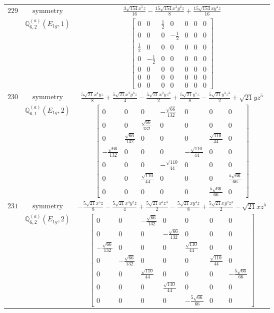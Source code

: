 \documentclass[fleqn,8pt,landscape]{jsarticle}
\begin{document}
\begin{longtable}{ccc}
$ 229 $ & $ \text{symmetry} $ & $ \frac{3 \sqrt{154} x^{5} z}{16} - \frac{15 \sqrt{154} x^{3} y^{2} z}{8} + \frac{15 \sqrt{154} x y^{4} z}{16} $ \\
$  $ & $ \mathbb{Q}_{6,2}^{(a)}(E_{1g},1) $ & $ \begin{bmatrix} 0 & 0 & \frac{1}{2} & 0 & 0 & 0 & 0 \\ 0 & 0 & 0 & - \frac{1}{2} & 0 & 0 & 0 \\ \frac{1}{2} & 0 & 0 & 0 & 0 & 0 & 0 \\ 0 & - \frac{1}{2} & 0 & 0 & 0 & 0 & 0 \\ 0 & 0 & 0 & 0 & 0 & 0 & 0 \\ 0 & 0 & 0 & 0 & 0 & 0 & 0 \\ 0 & 0 & 0 & 0 & 0 & 0 & 0 \end{bmatrix} $ \\ \hline
$ 230 $ & $ \text{symmetry} $ & $ \frac{5 \sqrt{21} x^{4} y z}{8} + \frac{5 \sqrt{21} x^{2} y^{3} z}{4} - \frac{5 \sqrt{21} x^{2} y z^{3}}{2} + \frac{5 \sqrt{21} y^{5} z}{8} - \frac{5 \sqrt{21} y^{3} z^{3}}{2} + \sqrt{21} y z^{5} $ \\
$  $ & $ \mathbb{Q}_{6,1}^{(a)}(E_{1g},2) $ & $ \begin{bmatrix} 0 & 0 & 0 & - \frac{\sqrt{66}}{132} & 0 & 0 & 0 \\ 0 & 0 & \frac{\sqrt{66}}{132} & 0 & 0 & 0 & 0 \\ 0 & \frac{\sqrt{66}}{132} & 0 & 0 & 0 & \frac{\sqrt{110}}{44} & 0 \\ - \frac{\sqrt{66}}{132} & 0 & 0 & 0 & - \frac{\sqrt{110}}{44} & 0 & 0 \\ 0 & 0 & 0 & - \frac{\sqrt{110}}{44} & 0 & 0 & 0 \\ 0 & 0 & \frac{\sqrt{110}}{44} & 0 & 0 & 0 & \frac{5 \sqrt{66}}{66} \\ 0 & 0 & 0 & 0 & 0 & \frac{5 \sqrt{66}}{66} & 0 \end{bmatrix} $ \\ \hline
$ 231 $ & $ \text{symmetry} $ & $ - \frac{5 \sqrt{21} x^{5} z}{8} - \frac{5 \sqrt{21} x^{3} y^{2} z}{4} + \frac{5 \sqrt{21} x^{3} z^{3}}{2} - \frac{5 \sqrt{21} x y^{4} z}{8} + \frac{5 \sqrt{21} x y^{2} z^{3}}{2} - \sqrt{21} x z^{5} $ \\
$  $ & $ \mathbb{Q}_{6,2}^{(a)}(E_{1g},2) $ & $ \begin{bmatrix} 0 & 0 & - \frac{\sqrt{66}}{132} & 0 & 0 & 0 & 0 \\ 0 & 0 & 0 & - \frac{\sqrt{66}}{132} & 0 & 0 & 0 \\ - \frac{\sqrt{66}}{132} & 0 & 0 & 0 & \frac{\sqrt{110}}{44} & 0 & 0 \\ 0 & - \frac{\sqrt{66}}{132} & 0 & 0 & 0 & \frac{\sqrt{110}}{44} & 0 \\ 0 & 0 & \frac{\sqrt{110}}{44} & 0 & 0 & 0 & - \frac{5 \sqrt{66}}{66} \\ 0 & 0 & 0 & \frac{\sqrt{110}}{44} & 0 & 0 & 0 \\ 0 & 0 & 0 & 0 & - \frac{5 \sqrt{66}}{66} & 0 & 0 \end{bmatrix} $ \\ \hline

\end{longtable}
\end{document}
